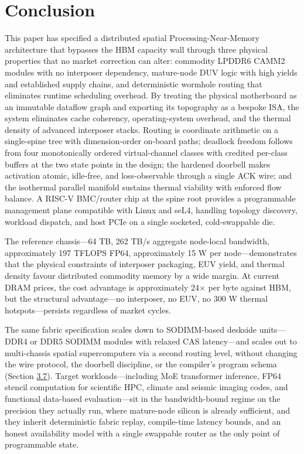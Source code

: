 \documentclass[12pt,onecolumn]{article}
\begin{document}
\section*{Conclusion}\label{sec:conclusion}

This paper has specified a distributed spatial Processing-Near-Memory architecture that bypasses the HBM capacity wall through three physical properties that no market correction can alter: commodity LPDDR6 CAMM2 modules with no interposer dependency\cite{16,17}, mature-node DUV logic with high yields and established supply chains, and deterministic wormhole routing that eliminates runtime scheduling overhead\cite{13,14}. By treating the physical motherboard as an immutable dataflow graph and exporting its topography as a bespoke ISA, the system eliminates cache coherency, operating-system overhead, and the thermal density of advanced interposer stacks. Routing is coordinate arithmetic on a single-spine tree with dimension-order on-board paths; deadlock freedom follows from four monotonically ordered virtual-channel classes with credited per-class buffers at the two state points in the design; the hardened doorbell makes activation atomic, idle-free, and loss-observable through a single ACK wire; and the isothermal parallel manifold sustains thermal viability with enforced flow balance. A RISC-V BMC/router chip at the spine root provides a programmable management plane compatible with Linux and seL4, handling topology discovery, workload dispatch, and host PCIe on a single socketed, cold-swappable die.

The reference chassis---64 TB, 262 TB/s aggregate node-local bandwidth, approximately 197 TFLOPS FP64, approximately 15 W per node---demonstrates that the physical constraints of interposer packaging, EUV yield, and thermal density favour distributed commodity memory by a wide margin. At current DRAM prices, the cost advantage is approximately 24$\times$ per byte against HBM, but the structural advantage---no interposer, no EUV, no 300 W thermal hotspots---persists regardless of market cycles.

The same fabric specification scales down to SODIMM-based deskside units---DDR4 or DDR5 SODIMM modules with relaxed CAS latency---and scales out to multi-chassis spatial supercomputers via a second routing level, without changing the wire protocol, the doorbell discipline, or the compiler's program schema (Section \hyperref[sec:3.7]{3.7}). Target workloads---including MoE transformer inference, FP64 stencil computation for scientific HPC, climate and seismic imaging codes, and functional data-based evaluation---sit in the bandwidth-bound regime on the precision they actually run, where mature-node silicon is already sufficient\cite{3,4,5}, and they inherit deterministic fabric replay, compile-time latency bounds, and an honest availability model with a single swappable router as the only point of programmable state.
\end{document}
